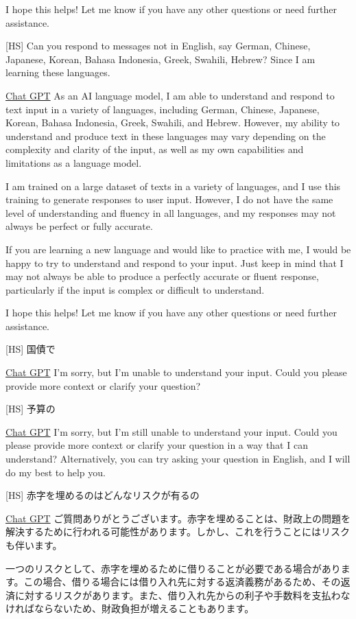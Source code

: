 \documentclass[
]{book}
\theoremstyle{definition}
\theoremstyle{definition}
\theoremstyle{definition}
\theoremstyle{definition}
\theoremstyle{remark}
\begin{document}
I hope this helps! Let me know if you have any other questions or need further assistance.

{[}HS{]} Can you respond to messages not in English, say German, Chinese, Japanese, Korean, Bahasa Indonesia, Greek, Swahili, Hebrew? Since I am learning these languages.

\protect\hyperlink{chatgpt}{Chat GPT} As an AI language model, I am able to understand and respond to text input in a variety of languages, including German, Chinese, Japanese, Korean, Bahasa Indonesia, Greek, Swahili, and Hebrew. However, my ability to understand and produce text in these languages may vary depending on the complexity and clarity of the input, as well as my own capabilities and limitations as a language model.

I am trained on a large dataset of texts in a variety of languages, and I use this training to generate responses to user input. However, I do not have the same level of understanding and fluency in all languages, and my responses may not always be perfect or fully accurate.

If you are learning a new language and would like to practice with me, I would be happy to try to understand and respond to your input. Just keep in mind that I may not always be able to produce a perfectly accurate or fluent response, particularly if the input is complex or difficult to understand.

I hope this helps! Let me know if you have any other questions or need further assistance.

{[}HS{]} 国債で

\protect\hyperlink{chatgpt}{Chat GPT} I'm sorry, but I'm unable to understand your input. Could you please provide more context or clarify your question?

{[}HS{]} 予算の

\protect\hyperlink{chatgpt}{Chat GPT} I'm sorry, but I'm still unable to understand your input. Could you please provide more context or clarify your question in a way that I can understand? Alternatively, you can try asking your question in English, and I will do my best to help you.

{[}HS{]} 赤字を埋めるのはどんなリスクが有るの

\protect\hyperlink{chatgpt}{Chat GPT} ご質問ありがとうございます。赤字を埋めることは、財政上の問題を解決するために行われる可能性があります。しかし、これを行うことにはリスクも伴います。

一つのリスクとして、赤字を埋めるために借りることが必要である場合があります。この場合、借りる場合には借り入れ先に対する返済義務があるため、その返済に対するリスクがあります。また、借り入れ先からの利子や手数料を支払わなければならないため、財政負担が増えることもあります。
\end{document}

